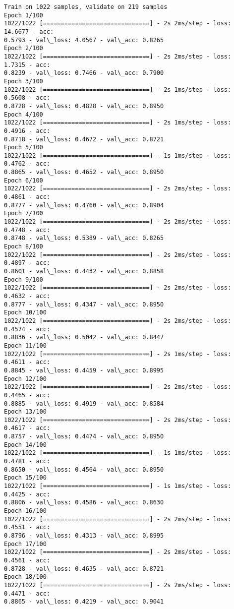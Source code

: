 \documentclass[11pt]{article}
\begin{document}
    \begin{Verbatim}[commandchars=\\\{\}]
Train on 1022 samples, validate on 219 samples
Epoch 1/100
1022/1022 [==============================] - 2s 2ms/step - loss: 14.6677 - acc:
0.5793 - val\_loss: 4.0567 - val\_acc: 0.8265
Epoch 2/100
1022/1022 [==============================] - 2s 2ms/step - loss: 1.7315 - acc:
0.8239 - val\_loss: 0.7466 - val\_acc: 0.7900
Epoch 3/100
1022/1022 [==============================] - 2s 1ms/step - loss: 0.5608 - acc:
0.8728 - val\_loss: 0.4828 - val\_acc: 0.8950
Epoch 4/100
1022/1022 [==============================] - 2s 1ms/step - loss: 0.4916 - acc:
0.8718 - val\_loss: 0.4672 - val\_acc: 0.8721
Epoch 5/100
1022/1022 [==============================] - 1s 1ms/step - loss: 0.4762 - acc:
0.8865 - val\_loss: 0.4652 - val\_acc: 0.8950
Epoch 6/100
1022/1022 [==============================] - 2s 2ms/step - loss: 0.4861 - acc:
0.8777 - val\_loss: 0.4760 - val\_acc: 0.8904
Epoch 7/100
1022/1022 [==============================] - 2s 2ms/step - loss: 0.4748 - acc:
0.8748 - val\_loss: 0.5389 - val\_acc: 0.8265
Epoch 8/100
1022/1022 [==============================] - 2s 2ms/step - loss: 0.4897 - acc:
0.8601 - val\_loss: 0.4432 - val\_acc: 0.8858
Epoch 9/100
1022/1022 [==============================] - 2s 2ms/step - loss: 0.4632 - acc:
0.8777 - val\_loss: 0.4347 - val\_acc: 0.8950
Epoch 10/100
1022/1022 [==============================] - 2s 2ms/step - loss: 0.4574 - acc:
0.8836 - val\_loss: 0.5042 - val\_acc: 0.8447
Epoch 11/100
1022/1022 [==============================] - 2s 1ms/step - loss: 0.4611 - acc:
0.8845 - val\_loss: 0.4459 - val\_acc: 0.8995
Epoch 12/100
1022/1022 [==============================] - 2s 2ms/step - loss: 0.4465 - acc:
0.8885 - val\_loss: 0.4919 - val\_acc: 0.8584
Epoch 13/100
1022/1022 [==============================] - 2s 2ms/step - loss: 0.4617 - acc:
0.8757 - val\_loss: 0.4474 - val\_acc: 0.8950
Epoch 14/100
1022/1022 [==============================] - 1s 1ms/step - loss: 0.4781 - acc:
0.8650 - val\_loss: 0.4564 - val\_acc: 0.8950
Epoch 15/100
1022/1022 [==============================] - 1s 1ms/step - loss: 0.4425 - acc:
0.8806 - val\_loss: 0.4586 - val\_acc: 0.8630
Epoch 16/100
1022/1022 [==============================] - 2s 2ms/step - loss: 0.4551 - acc:
0.8796 - val\_loss: 0.4313 - val\_acc: 0.8995
Epoch 17/100
1022/1022 [==============================] - 2s 2ms/step - loss: 0.4561 - acc:
0.8728 - val\_loss: 0.4635 - val\_acc: 0.8721
Epoch 18/100
1022/1022 [==============================] - 2s 2ms/step - loss: 0.4471 - acc:
0.8865 - val\_loss: 0.4219 - val\_acc: 0.9041

\end{Verbatim}
\end{document}
